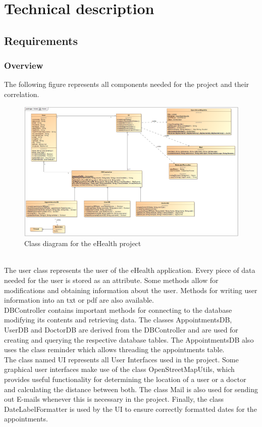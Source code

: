 \documentclass[a4paper, 12pt]{report}
\begin{document}


\chapter{Technical description}
\section{Requirements}
\subsection{Overview}
The following figure represents all components needed for the project and their correlation.
\begin{figure}[!h]
\includegraphics[width=\linewidth]{clImg.png} 
\caption{Class diagram for the eHealth project}
\end{figure}
\\The user class represents the user of the eHealth application. Every piece of data needed for the user is stored as an attribute. Some methods allow for modifications and obtaining information about the user. Methods for writing user information into an txt or pdf are also available. \\
DBController contains important methods for connecting to the database modifying its contents and retrieving data. The classes AppointmentsDB, UserDB and DoctorDB are derived from the DBController and are used for creating and querying the respective database tables. The AppointmentsDB also uses the class reminder which allows threading the appointments table.\\The class named UI represents all User Interfaces used in the project. Some graphical user interfaces make use of the class OpenStreetMapUtils, which provides useful functionality for determining the location of a user or a doctor and calculating the distance between both. The class Mail is also used for sending out E-mails whenever this is necessary in the project. Finally, the class DateLabelFormatter is used by the UI to ensure correctly formatted dates for the appointments. \\
\end{document}

